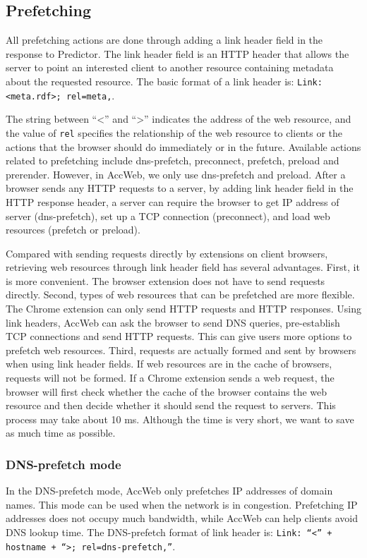 \subsection{Prefetching}

All prefetching actions are done through adding a link header field in the response to Predictor. The link header field is an HTTP header that allows the server to point an interested client to another resource containing metadata about the requested resource. The basic format of a link header is: \texttt{Link: <meta.rdf>; rel=meta,}.

The string between ``<'' and ``>'' indicates the address of the web resource, and the value of \texttt{rel} specifies the relationship of the web resource to clients or the actions that the browser should do immediately or in the future. Available actions related to prefetching include dns-prefetch, preconnect, prefetch, preload and prerender. However, in AccWeb, we only use dns-prefetch and preload. After a browser sends any HTTP requests to a server, by adding link header field in the HTTP response header, a server can require the browser to get IP address of server (dns-prefetch), set up a TCP connection (preconnect), and load web resources (prefetch or preload).

Compared with sending requests directly by extensions on client browsers, retrieving web resources through link header field has several advantages. First, it is more convenient. The browser extension does not have to send requests directly. Second, types of web resources that can be prefetched are more flexible. The Chrome extension can only send HTTP requests and HTTP responses. Using link headers, AccWeb can ask the browser to send DNS queries, pre-establish TCP connections and send HTTP requests. This can give users more options to prefetch web resources. Third, requests are actually formed and sent by browsers when using link header fields. If web resources are in the cache of browsers, requests will not be formed. If a Chrome extension sends a web request, the browser will first check whether the cache of the browser contains the web resource and then decide whether it should send the request to servers. This process may take about 10 ms. Although the time is very short, we want to save as much time as possible.

\subsubsection*{DNS-prefetch mode}
In the DNS-prefetch mode, AccWeb only prefetches IP addresses of domain names. This mode can be used when the network is in congestion. Prefetching IP addresses does not occupy much bandwidth, while AccWeb can help clients avoid DNS lookup time. The DNS-prefetch format of link header is: \texttt{Link: ``<'' + hostname + ``>; rel=dns-prefetch,''}.


